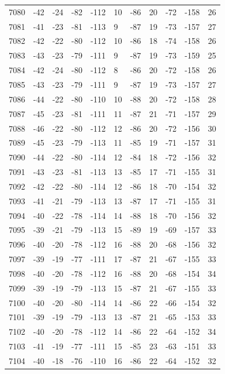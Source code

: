 \begin{table}[H]
\begin{tabular}{lllllllllll}
7080 & -42 & -24 & -82 & -112 & 10 & -86 & 20 & -72 & -158 & 26 \\
7081 & -41 & -23 & -81 & -113 & 9 & -87 & 19 & -73 & -157 & 27 \\
7082 & -42 & -22 & -80 & -112 & 10 & -86 & 18 & -74 & -158 & 26 \\
7083 & -43 & -23 & -79 & -111 & 9 & -87 & 19 & -73 & -159 & 25 \\
7084 & -42 & -24 & -80 & -112 & 8 & -86 & 20 & -72 & -158 & 26 \\
7085 & -43 & -23 & -79 & -111 & 9 & -87 & 19 & -73 & -157 & 27 \\
7086 & -44 & -22 & -80 & -110 & 10 & -88 & 20 & -72 & -158 & 28 \\
7087 & -45 & -23 & -81 & -111 & 11 & -87 & 21 & -71 & -157 & 29 \\
7088 & -46 & -22 & -80 & -112 & 12 & -86 & 20 & -72 & -156 & 30 \\
7089 & -45 & -23 & -79 & -113 & 11 & -85 & 19 & -71 & -157 & 31 \\
7090 & -44 & -22 & -80 & -114 & 12 & -84 & 18 & -72 & -156 & 32 \\
7091 & -43 & -23 & -81 & -113 & 13 & -85 & 17 & -71 & -155 & 31 \\
7092 & -42 & -22 & -80 & -114 & 12 & -86 & 18 & -70 & -154 & 32 \\
7093 & -41 & -21 & -79 & -113 & 13 & -87 & 17 & -71 & -155 & 31 \\
7094 & -40 & -22 & -78 & -114 & 14 & -88 & 18 & -70 & -156 & 32 \\
7095 & -39 & -21 & -79 & -113 & 15 & -89 & 19 & -69 & -157 & 33 \\
7096 & -40 & -20 & -78 & -112 & 16 & -88 & 20 & -68 & -156 & 32 \\
7097 & -39 & -19 & -77 & -111 & 17 & -87 & 21 & -67 & -155 & 33 \\
7098 & -40 & -20 & -78 & -112 & 16 & -88 & 20 & -68 & -154 & 34 \\
7099 & -39 & -19 & -79 & -113 & 15 & -87 & 21 & -67 & -155 & 33 \\
7100 & -40 & -20 & -80 & -114 & 14 & -86 & 22 & -66 & -154 & 32 \\
7101 & -39 & -19 & -79 & -113 & 13 & -87 & 21 & -65 & -153 & 33 \\
7102 & -40 & -20 & -78 & -112 & 14 & -86 & 22 & -64 & -152 & 34 \\
7103 & -41 & -19 & -77 & -111 & 15 & -85 & 23 & -63 & -151 & 33 \\
7104 & -40 & -18 & -76 & -110 & 16 & -86 & 22 & -64 & -152 & 32 \\

\end{tabular}
\end{table}
